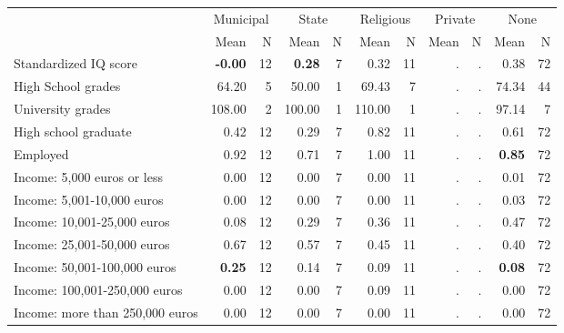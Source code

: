 \begin{tabular}{l r r r r r r r r r r}
\toprule
& \multicolumn{2}{c}{Municipal} & \multicolumn{2}{c}{State} & \multicolumn{2}{c}{Religious} & \multicolumn{2}{c}{Private} & \multicolumn{2}{c}{None} \\
& \scriptsize Mean & \scriptsize N & \scriptsize Mean & \scriptsize N & \scriptsize Mean & \scriptsize N & \scriptsize Mean & \scriptsize N & \scriptsize Mean & \scriptsize N \\
\midrule
Standardized IQ score & \textbf{    -0.00} &        12 & \textbf{     0.28} &         7 &      0.32 &        11 &         . & . &      0.38 &        72 \\
High School grades &     64.20 &         5 &     50.00 &         1 &     69.43 &         7 &         . & . &     74.34 &        44 \\
University grades &    108.00 &         2 &    100.00 &         1 &    110.00 &         1 &         . & . &     97.14 &         7 \\
High school graduate &      0.42 &        12 &      0.29 &         7 &      0.82 &        11 &         . & . &      0.61 &        72 \\
Employed &      0.92 &        12 &      0.71 &         7 &      1.00 &        11 &         . & . & \textbf{     0.85} &        72 \\
Income: 5,000 euros or less &      0.00 &        12 &      0.00 &         7 &      0.00 &        11 &         . & . &      0.01 &        72 \\
Income: 5,001-10,000 euros &      0.00 &        12 &      0.00 &         7 &      0.00 &        11 &         . & . &      0.03 &        72 \\
Income: 10,001-25,000 euros &      0.08 &        12 &      0.29 &         7 &      0.36 &        11 &         . & . &      0.47 &        72 \\
Income: 25,001-50,000 euros &      0.67 &        12 &      0.57 &         7 &      0.45 &        11 &         . & . &      0.40 &        72 \\
Income: 50,001-100,000 euros & \textbf{     0.25} &        12 &      0.14 &         7 &      0.09 &        11 &         . & . & \textbf{     0.08} &        72 \\
Income: 100,001-250,000 euros &      0.00 &        12 &      0.00 &         7 &      0.09 &        11 &         . & . &      0.00 &        72 \\
Income: more than 250,000 euros &      0.00 &        12 &      0.00 &         7 &      0.00 &        11 &         . & . &      0.00 &        72 \\

\end{tabular}
